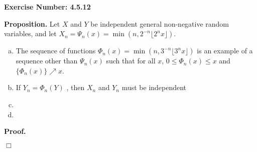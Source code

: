 \documentclass{article}
\begin{document}
\noindent \textbf{Exercise Number: 4.5.12}  %

\medskip 

\noindent \textbf{Proposition.} Let $X$ and $Y$ be independent general non-negative random variables, and let $X_n = \Psi_n(x) = \min (n, 2^{-n} \lfloor 2^n x \rfloor)$.

\begin{enumerate}[a.]

\item The sequence of functions $\Phi_n(x) = \min (n, 3^{-n} \lfloor 3^n x \rfloor)$ is an example of a sequence other than $\Psi_n(x)$ such that for all $x$, $0 \leq \Phi_n(x) \leq x$ and $\{\Phi_n(x)\} \nearrow x$.

\item If $Y_n = \Phi_n(Y)$ , then $X_n$ and $Y_n$ must be independent 

\item 

\item

\end{enumerate}

\bigskip

\noindent \textbf{Proof.} 

\hfill $\Box$
\end{document}
